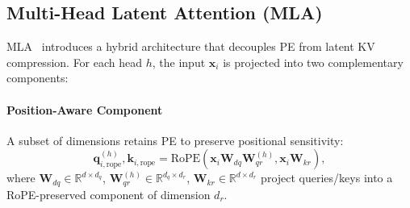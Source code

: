 \subsection{Multi-Head Latent Attention (MLA)}  


MLA~\cite{corr/abs-2405-04434} introduces a hybrid architecture that decouples PE from latent KV compression. 
For each head $h$, the input $\bm{x}_i$ is projected into two complementary components:  

\paragraph{Position-Aware Component}
A subset of dimensions retains PE to preserve positional sensitivity:  
$$
 \bm{q}_{i,\text{rope}}^{(h)}, \bm{k}_{i,\text{rope}} = \text{RoPE}
    \left( 
        \bm{x}_i \bm{W}_{dq}
        \bm{W}_{qr}^{(h)}, \bm{x}_i \bm{W}_{kr} 
    \right),
$$
where $\bm{W}_{dq} \in \mathbb{R}^{d \times d_q}$, $\bm{W}_{qr}^{(h)} \in \mathbb{R}^{d_q\times d_r}$, $\bm{W}_{kr} \in \mathbb{R}^{d \times d_r}$ project queries/keys into a RoPE-preserved component of dimension $d_r$.  

